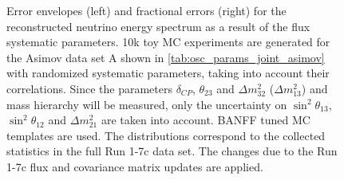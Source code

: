 \begin{figure}[htb]
\caption {
Error envelopes (left) and fractional errors (right) for the reconstructed neutrino energy spectrum
as a result of the flux systematic parameters.
10k toy MC experiments are generated for the Asimov data set A shown in \cref{tab:osc_params_joint_asimov}
with randomized systematic parameters, taking into account their correlations.
Since the parameters $\delta_{CP}$, $\theta_{23}$ and $\Delta m^2_{32}$ ($\Delta m^2_{13}$) and mass hierarchy
will be measured,
only the uncertainty on 
$\sin^2 \theta_{13}$,
$\sin^2 \theta_{12}$
and 
$\Delta m^2_{21}$ 
are taken into account.
BANFF tuned MC templates are used. 
The distributions correspond to the collected statistics in the full Run 1-7c data set.
The changes due to the Run 1-7c flux and covariance matrix updates are applied.
}
\label{fig:flux_envelope_Asimov_A_run17c}
\end{figure}


